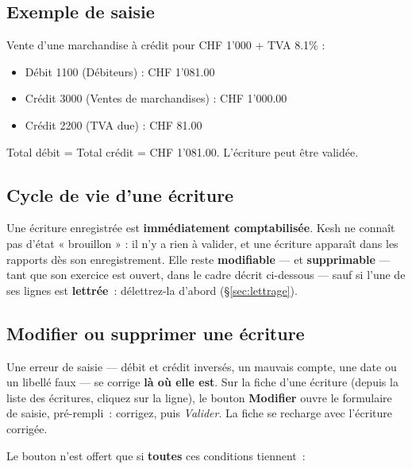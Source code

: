 \documentclass[a4paper,11pt,oneside]{article}
\begin{document}
\subsection{Exemple de saisie}

Vente d'une marchandise à crédit pour CHF 1'000 + TVA 8.1\% :

\begin{itemize}
    \item Débit 1100 (Débiteurs) : CHF 1'081.00
    \item Crédit 3000 (Ventes de marchandises) : CHF 1'000.00
    \item Crédit 2200 (TVA due) : CHF 81.00
\end{itemize}

Total débit = Total crédit = CHF 1'081.00. L'écriture peut être validée.

\subsection{Cycle de vie d'une écriture}

Une écriture enregistrée est \textbf{immédiatement comptabilisée}. Kesh ne connaît pas
d'état « brouillon » : il n'y a rien à valider, et une écriture apparaît dans les rapports
dès son enregistrement. Elle reste \textbf{modifiable} --- et \textbf{supprimable} ---
tant que son exercice est ouvert, dans le cadre décrit ci-dessous --- sauf si l'une de ses
lignes est \textbf{lettrée}~: délettrez-la d'abord (\S\ref{sec:lettrage}).

\subsection{Modifier ou supprimer une écriture}\label{sec:modifier-ecriture}

Une erreur de saisie --- débit et crédit inversés, un mauvais compte, une date ou un libellé
faux --- se corrige \textbf{là où elle est}. Sur la fiche d'une écriture (depuis la liste des
écritures, cliquez sur la ligne), le bouton \textbf{Modifier} ouvre le formulaire de saisie,
pré-rempli~: corrigez, puis \emph{Valider}. La fiche se recharge avec l'écriture corrigée.

Le bouton n'est offert que si \textbf{toutes} ces conditions tiennent~:
\end{document}
